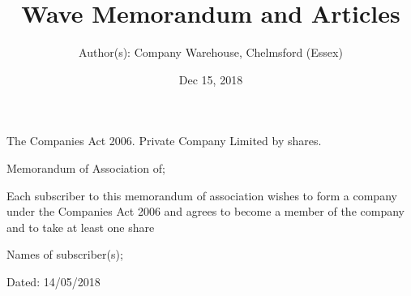 \documentclass[letterpaper,10pt,english]{sphinxmanual}
\title{Wave Memorandum and Articles}
\date{Dec 15, 2018}
\author{Author(s): Company Warehouse, Chelmsford (Essex)}
\begin{document}
\maketitle
\sphinxtableofcontents
{}\label{\detokenize{index::doc}}


The Companies Act 2006. Private Company Limited by shares.

Memorandum of Association of; 

Each subscriber to this memorandum of association wishes to form a company under the Companies Act 2006 and agrees to become a member of the company and to take at least one share

Names of subscriber(s); 

Dated: 14/05/2018
\end{document}
